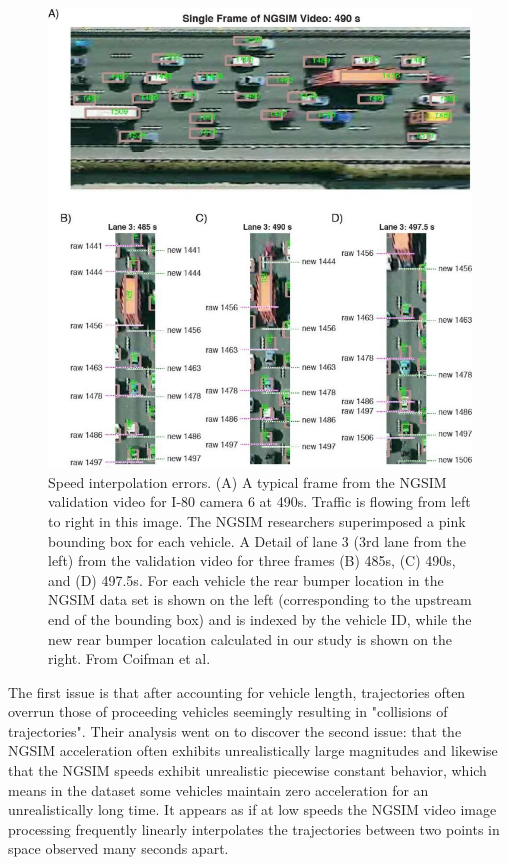 \documentclass[11pt]{uonthesis}
\begin{document}
\begin{figure}[h]
    \centering
    \includegraphics[width=14cm]{interpolation.jpg}
    \caption{Speed interpolation errors. (A) A typical frame from the NGSIM validation video for I-80 camera 6 at 490s. Traffic is flowing from left to right in this image. The NGSIM researchers superimposed a pink bounding box for each vehicle. A Detail of lane 3 (3rd lane from the left) from the validation video for three frames (B) 485s, (C) 490s, and (D) 497.5s. For each vehicle the rear bumper location in the NGSIM data set is shown on the left (corresponding to the upstream end of the bounding box) and is indexed by the vehicle ID, while the new rear bumper location calculated in our study is shown on the right. From Coifman et al.}
\end{figure}

The first issue is that after accounting for vehicle length, trajectories often overrun those of proceeding vehicles seemingly resulting in "collisions of trajectories". Their analysis went on to discover the second issue: that the NGSIM acceleration often exhibits unrealistically large magnitudes and likewise that the NGSIM speeds exhibit unrealistic piecewise constant behavior, which means in the dataset some vehicles maintain zero acceleration for an unrealistically long time. It appears as if at low speeds the NGSIM video image processing frequently linearly interpolates the trajectories between two points in space observed many seconds apart.
\end{document}
